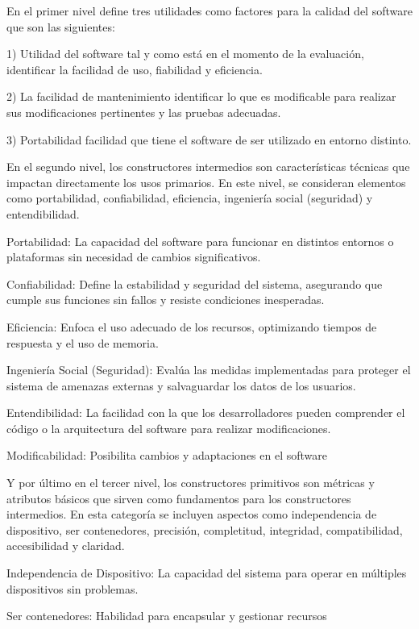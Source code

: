 		En el primer nivel define tres utilidades como factores para la calidad del software que son las siguientes: 
		
		1) Utilidad del software tal y como está en el momento de la evaluación, identificar la 
		facilidad de uso, fiabilidad y eficiencia.
		
		2) La facilidad de mantenimiento identificar lo que es modificable para realizar sus 
		modificaciones pertinentes y las pruebas adecuadas.
		
		3) Portabilidad facilidad que tiene el software de ser utilizado en entorno distinto.
		
		En el segundo nivel, los constructores intermedios son características técnicas que impactan directamente los usos primarios. En este nivel, se consideran elementos como portabilidad, confiabilidad, eficiencia, ingeniería social (seguridad) y entendibilidad.
		
		Portabilidad: La capacidad del software para funcionar en distintos entornos o plataformas sin necesidad de cambios significativos.
		
		Confiabilidad: Define la estabilidad y seguridad del sistema, asegurando que cumple sus funciones sin fallos y resiste condiciones inesperadas.
		
		Eficiencia: Enfoca el uso adecuado de los recursos, optimizando tiempos de respuesta y el uso de memoria.
		
		Ingeniería Social (Seguridad): Evalúa las medidas implementadas para proteger el sistema de amenazas externas y salvaguardar los datos de los usuarios.
		
		Entendibilidad: La facilidad con la que los desarrolladores pueden comprender el código o la arquitectura del software para realizar modificaciones.
		
		Modificabilidad: Posibilita cambios y adaptaciones en el software
		
		Y por último en el tercer nivel, los constructores primitivos son métricas y atributos básicos que sirven como fundamentos para los constructores intermedios. En esta categoría se incluyen aspectos como independencia de dispositivo, ser contenedores, precisión, completitud, integridad, compatibilidad, accesibilidad y claridad.
		
		Independencia de Dispositivo: La capacidad del sistema para operar en múltiples dispositivos sin problemas.
		
		Ser contenedores: Habilidad para encapsular y gestionar recursos
		
